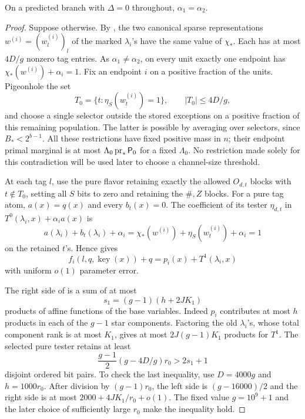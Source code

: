 \begin{lemma}
\label{lem:zero-delta}
On a predicted branch with \(\Delta=0\) throughout,
\(\alpha_1=\alpha_2\).
\end{lemma}

\begin{proof}
Suppose otherwise.  By , the two
canonical sparse representations \(w^{(i)}=(w_l^{(i)})_l\)
of the marked \(\lambda_i\)'s have the same value of \(\chi_*\).
Each has at most \(4D/g\) nonzero tag entries.
As \(\alpha_1\ne\alpha_2\), on every unit exactly one endpoint
has \(\chi_*(w^{(i)})+\alpha_i=1\).
Fix an endpoint \(i\) on a positive fraction of the units.
Pigeonhole the set
\[
 T_0=\{t:\eta_S(w_t^{(i)})=1\},
 \qquad |T_0|\le4D/g,
 \]
and choose a single selector outside the stored exceptions
on a positive fraction of this remaining population.
The latter is possible by averaging over selectors, since
\(B_*<2^{b-1}\).
All these restrictions have fixed positive mass in \(n\);
their endpoint primal marginal is at most
\(\Lambda_0\operatorname{pr}_*{\mathsf P_0}\) for a fixed \(\Lambda_0\).
No restriction made solely for this contradiction will be
used later to choose a channel-size threshold.

At each tag \(l\), use the pure flavor retaining exactly the
allowed \(O_{d,t}\) blocks with \(t\notin T_0\), setting all
\(S\) bits to zero and retaining the \(\#,Z\) blocks.
For a pure tag atom, \(a(x)=q(x)\) and every \(b_t(x)=0\).
The coefficient of its tester \(\eta_{d,t}\) in
\(T^0(\lambda_i,x)+\alpha_i a(x)\) is
\[
 a(\lambda_i)+b_t(\lambda_i)+\alpha_i
 =\chi_*(w^{(i)})+\eta_S(w_t^{(i)})+\alpha_i=1
 \]
on the retained \(t\)'s.  Hence  gives
\begin{equation}
 f_i(l,q,\operatorname{key}(x))+q
 =p_i(x)+T^1(\lambda_i,x)
 \label{eq:pure-prediction}
\end{equation}
with uniform \(o(1)\) parameter error.

The right side of  is a sum of at
most
\begin{equation}
 s_1=(g-1)(h+2JK_1)
 \label{eq:synthetic-product-count}
\end{equation}
products of affine functions of the base variables.
Indeed \(p_i\) contributes at most \(h\) products in each
of the \(g-1\) star components.  Factoring the old
\(\lambda_i\)'s, whose total component rank is at most
\(K_1\), gives at most \(2J(g-1)K_1\) products for \(T^1\).
The selected pure tester retains at least
\begin{equation}
 \frac{g-1}{2}(g-4D/g)r_0>2s_1+1
 \label{eq:synthetic-tester-room}
\end{equation}
disjoint ordered bit pairs.  To check the last inequality,
use \(D=4000g\) and \(h=1000r_0\).  After division by
\((g-1)r_0\), the left side is \((g-16000)/2\) and the
right side is at most \(2000+4JK_1/r_0+o(1)\).
The fixed value \(g=10^9+1\) and the later choice of
sufficiently large \(r_0\) make the inequality hold.


\end{proof}
